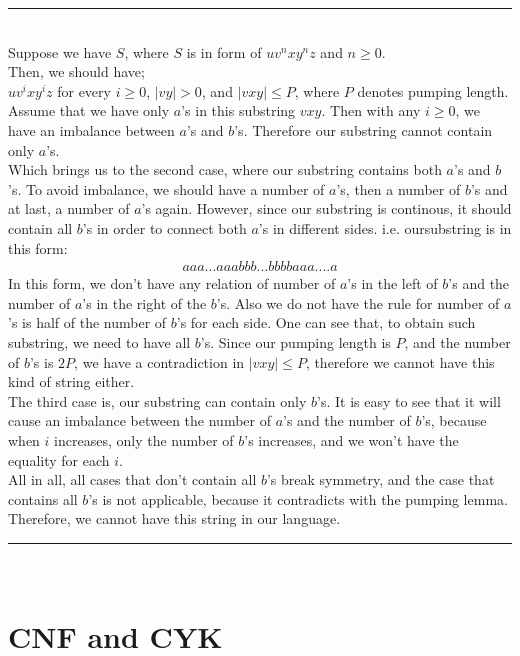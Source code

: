 \documentclass[a4paper,12pt]{article}
\newcommand{\HRule}{\rule{\linewidth}{1mm}}
\begin{document}
\HRule\\
Suppose we have $S$, where $S$ is in form of $uv^nxy^nz$ and $n \geq 0$.\\
Then, we should have;\\
$uv^ixy^iz$ for every $i \geq 0$, $|vy| > 0$, and $|vxy| \leq P$, where $P$ denotes pumping length.\\
Assume that we have only $a$'s in this substring $vxy$. Then with any $i \geq 0$, we have an imbalance between $a$'s and $b$'s. Therefore our substring cannot contain only $a$'s.\\
Which brings us to the second case, where our substring contains both $a$'s and $b$'s. To avoid imbalance, we should have a number of $a$'s, then a number of $b$'s and at last, a number of $a$'s again. However, since our substring is continous, it should contain all $b$'s in order to connect both $a$'s in different sides. i.e. oursubstring is in this form:
\begin{align*}
aaa...aaabbb...bbbbaaa....a
\end{align*} 
In this form, we don't have any relation of number of $a$'s in the left of $b$'s and the number of $a$'s in the right of the $b$'s. Also we do not have the rule for number of $a$'s is half of the number of $b$'s for each side. One can see that, to obtain such substring, we need to have all  $b$'s. Since our pumping length is $P$, and the number of $b$'s is $2P$, we have a contradiction in $|vxy| \leq P$, therefore we cannot have this kind of string either.\\
The third case is, our substring can contain only $b$'s. It is easy to see that it will cause an imbalance between the number of $a$'s and the number of $b$'s, because when $i$ increases, only the number of $b$'s increases, and we won't have the equality for each $i$.\\
All in all, all cases that don't contain all $b$'s break symmetry, and the case that contains all $b$'s is not applicable, because it contradicts with the pumping lemma. Therefore, we cannot have this string in our language.\\
\HRule\\





\newpage
\section{CNF and CYK \hfill {}}
\end{document}
